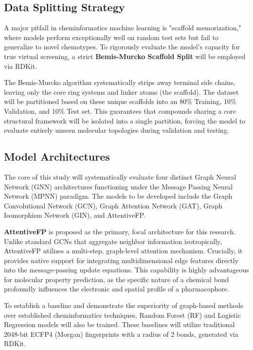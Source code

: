 \subsection{Data Splitting Strategy}

A major pitfall in cheminformatics machine learning is "scaffold memorization," where models perform exceptionally well on random test sets but fail to generalize to novel chemotypes. To rigorously evaluate the model's capacity for true virtual screening, a strict \textbf{Bemis-Murcko Scaffold Split} will be employed via RDKit. 

The Bemis-Murcko algorithm systematically strips away terminal side chains, leaving only the core ring systems and linker atoms (the scaffold). The dataset will be partitioned based on these unique scaffolds into an 80\% Training, 10\% Validation, and 10\% Test set. This guarantees that compounds sharing a core structural framework will be isolated into a single partition, forcing the model to evaluate entirely unseen molecular topologies during validation and testing.

\subsection{Model Architectures}

The core of this study will systematically evaluate four distinct Graph Neural Network (GNN) architectures functioning under the Message Passing Neural Network (MPNN) paradigm. The models to be developed include the Graph Convolutional Network (GCN), Graph Attention Network (GAT), Graph Isomorphism Network (GIN), and AttentiveFP.

\textbf{AttentiveFP} is proposed as the primary, focal architecture for this research. Unlike standard GCNs that aggregate neighbor information isotropically, AttentiveFP utilizes a multi-step, graph-level attention mechanism. Crucially, it provides native support for integrating multidimensional edge features directly into the message-passing update equations. This capability is highly advantageous for molecular property prediction, as the specific nature of a chemical bond profoundly influences the electronic and spatial profile of a pharmacophore.

To establish a baseline and demonstrate the superiority of graph-based methods over established cheminformatics techniques, Random Forest (RF) and Logistic Regression models will also be trained. These baselines will utilize traditional 2048-bit ECFP4 (Morgan) fingerprints with a radius of 2 bonds, generated via RDKit.

